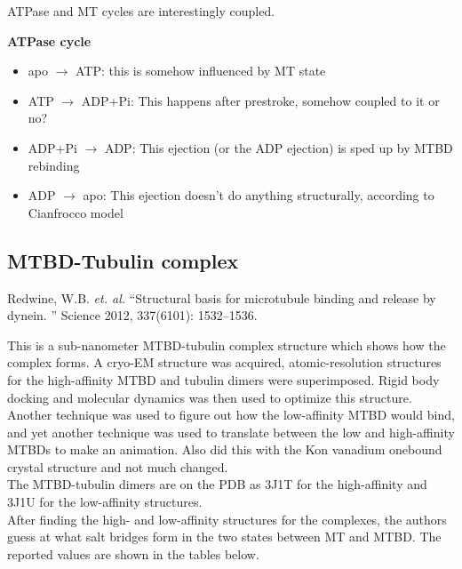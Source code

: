 \documentclass[10pt]{article} %
\begin{document}
ATPase and MT cycles are interestingly coupled.

\textbf{ATPase cycle}
\begin{itemize}
\item apo $\rightarrow$ ATP: this is somehow influenced by MT state
\item ATP $\rightarrow$ ADP+Pi: This happens after prestroke, somehow coupled to it or no?
\item ADP+Pi $\rightarrow$ ADP: This ejection (or the ADP ejection) is sped up by MTBD rebinding
\item ADP $\rightarrow$ apo: This ejection doesn't do anything structurally, according to Cianfrocco model
\end{itemize}

\subsection{MTBD-Tubulin complex}
Redwine, W.B. \textit{et. al.} ``Structural basis for microtubule binding and release by dynein. '' Science 2012, 337(6101): 1532–1536.

This is a sub-nanometer MTBD-tubulin complex structure which shows how the complex forms. A cryo-EM structure was acquired, atomic-resolution structures for the high-affinity
MTBD and tubulin dimers were superimposed.  Rigid body docking and molecular dynamics was then used to optimize this structure. Another technique was used to figure out how
the low-affinity MTBD would bind, and yet another technique was used to translate between the low and high-affinity MTBDs to make an animation. Also did this with the Kon
vanadium onebound crystal structure and not much changed.\\

The MTBD-tubulin dimers are on the PDB as 3J1T for the high-affinity and 3J1U for the low-affinity structures.\\

After finding the high- and low-affinity structures for the complexes, the authors guess at what salt bridges form in the two states between MT and MTBD. The reported values are shown in the tables below.\\
\end{document}
